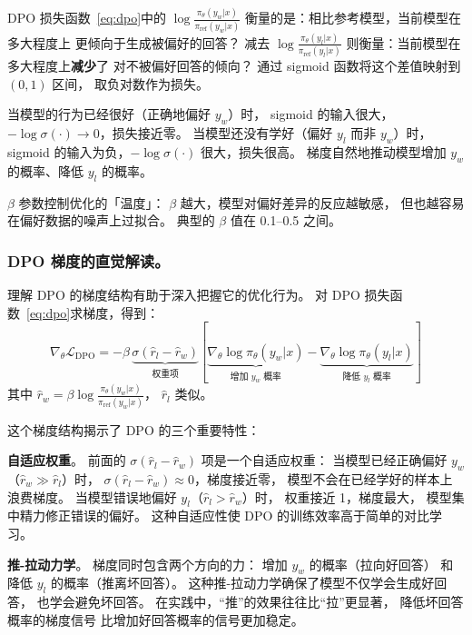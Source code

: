DPO 损失函数~\eqref{eq:dpo}中的
$\log \frac{\pi_\theta(y_w|x)}{\pi_{\mathrm{ref}}(y_w|x)}$
衡量的是：相比参考模型，当前模型在多大程度上
更倾向于生成被偏好的回答？
减去 $\log \frac{\pi_\theta(y_l|x)}{\pi_{\mathrm{ref}}(y_l|x)}$
则衡量：当前模型在多大程度上\textbf{减少}了
对不被偏好回答的倾向？
通过 sigmoid 函数将这个差值映射到 $(0, 1)$ 区间，
取负对数作为损失。

当模型的行为已经很好（正确地偏好 $y_w$）时，
sigmoid 的输入很大，$-\log \sigma(\cdot) \to 0$，损失接近零。
当模型还没有学好（偏好 $y_l$ 而非 $y_w$）时，
sigmoid 的输入为负，$-\log \sigma(\cdot)$ 很大，损失很高。
梯度自然地推动模型增加 $y_w$ 的概率、降低 $y_l$ 的概率。

$\beta$ 参数控制优化的「温度」：
$\beta$ 越大，模型对偏好差异的反应越敏感，
但也越容易在偏好数据的噪声上过拟合。
典型的 $\beta$ 值在 0.1--0.5 之间。

\subsubsection{DPO 梯度的直觉解读。}

理解 DPO 的梯度结构有助于深入把握它的优化行为。
对 DPO 损失函数~\eqref{eq:dpo}求梯度，得到：
\begin{equation}
  \nabla_\theta \mathcal{L}_{\text{DPO}} = -\beta \,
  \underbrace{\sigma\!\left(\hat{r}_l - \hat{r}_w\right)}_{\text{权重项}}
  \left[
    \underbrace{\nabla_\theta \log \pi_\theta(y_w|x)}_{\text{增加 }y_w\text{ 概率}}
    - \underbrace{\nabla_\theta \log \pi_\theta(y_l|x)}_{\text{降低 }y_l\text{ 概率}}
  \right]
\end{equation}
其中 $\hat{r}_w = \beta \log \frac{\pi_\theta(y_w|x)}{\pi_{\text{ref}}(y_w|x)}$，
$\hat{r}_l$ 类似。

这个梯度结构揭示了 DPO 的三个重要特性：

\textbf{自适应权重}。
前面的 $\sigma(\hat{r}_l - \hat{r}_w)$ 项是一个自适应权重：
当模型已经正确偏好 $y_w$（$\hat{r}_w \gg \hat{r}_l$）时，
$\sigma(\hat{r}_l - \hat{r}_w) \approx 0$，梯度接近零，
模型不会在已经学好的样本上浪费梯度。
当模型错误地偏好 $y_l$（$\hat{r}_l > \hat{r}_w$）时，
权重接近 1，梯度最大，
模型集中精力修正错误的偏好。
这种自适应性使 DPO 的训练效率高于简单的对比学习。

\textbf{推-拉动力学}。
梯度同时包含两个方向的力：
增加 $y_w$ 的概率（拉向好回答）
和降低 $y_l$ 的概率（推离坏回答）。
这种推-拉动力学确保了模型不仅学会生成好回答，
也学会避免坏回答。
在实践中，“推”的效果往往比“拉”更显著，
降低坏回答概率的梯度信号
比增加好回答概率的信号更加稳定。

